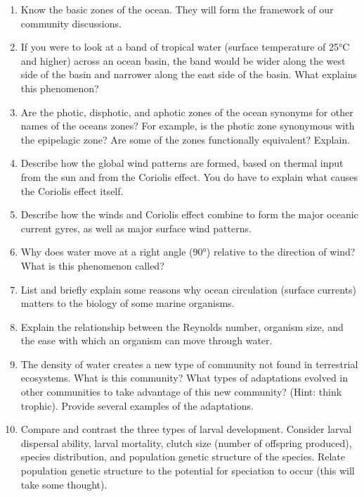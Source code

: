 \documentclass[nofonts, letterpaper]{tufte-handout}
\begin{document}
\begin{enumerate}

\item
  Know the basic zones of the ocean. They will form the framework of our
  community discussions.

\item
  If you were to look at a band of tropical water (surface temperature
  of 25°C and higher) across an ocean basin, the band would be wider
  along the west side of the basin and narrower along the east side of
  the basin. What explains this phenomenon?

\item
  Are the photic, disphotic, and aphotic zones of the ocean synonyms for
  other names of the oceans zones? For example, is the photic zone
  synonymous with the epipelagic zone? Are some of the zones
  functionally equivalent? Explain.
  
\item Describe how the global wind patterns are formed, based on thermal input from the sun and from the Coriolis effect. You do have to explain what causes the Coriolis effect itself.

\item Describe how the winds and Coriolis effect combine to form the major oceanic current gyres, as well as major surface wind patterns.

\item Why does water move at a right angle (90°) relative to the direction of wind? What is this phenomenon called?

\item List and briefly explain some reasons why ocean circulation (surface currents) matters to the biology of some marine organisms.

\item Explain the relationship between the Reynolds number, organism size, and the ease with which an organism can move through water.

\item
  The density of water creates a new type of community not found in
  terrestrial ecosystems. What is this community? What types of
  adaptations evolved in other communities to take advantage of this new
  community? (Hint: think trophic). Provide several examples of the
  adaptations.

\item
  Compare and contrast the three types of larval development. Consider
  larval dispersal ability, larval mortality, clutch size (number of
  offspring produced), species distribution, and population genetic
  structure of the species. Relate population genetic structure to the
  potential for speciation to occur (this will take some thought).


\end{enumerate}
\end{document}
